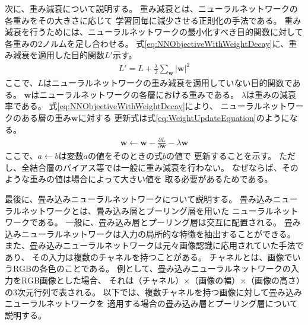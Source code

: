 次に、重み減衰について説明する。
重み減衰とは、ニューラルネットワークの各重みをその大きさに応じて
学習回毎に減少させる正則化の手法である。
重み減衰を行うためには、ニューラルネットワークの最小化すべき目的関数に対して
各重みの2ノルムを足し合わせる。
式\ref{eq:NNObjectiveWithWeightDecay}に、重み減衰を適用した目的関数$L'$示す。
\begin{gather} \label{eq:NNObjectiveWithWeightDecay}
  L' = L + \frac{\lambda}{2} \sum_{\mathbf{w}} {|\mathbf{w}|}^2
\end{gather}
ここで、$L$はニューラルネットワークの重み減衰を適用していない目的関数である。
$\mathbf{w}$はニューラルネットワークの各層における重みである。
$\lambda$は重みの減衰率である。
式\ref{eq:NNObjectiveWithWeightDecay}により、
ニューラルネットワークのある層の重み$\mathbf{w}$に対する
更新式は式\ref{eq:WeightUpdateEquation}のようになる。
\begin{gather} \label{eq:WeightUpdateEquation}
  \mathbf{w} \leftarrow \mathbf{w} - \frac{\partial L}{\partial \mathbf{w}}
                                   - \lambda \mathbf{w}
\end{gather}
ここで、$a \leftarrow b$は変数$a$の値をそのときの式$b$の値で
更新することを示す。
ただし、全結合層のバイアス等では一般に重み減衰を行わない。
なぜならば、そのような重みの値は場合によって大きい値を
取る必要があるためである。

最後に、畳み込みニューラルネットワークについて説明する。
畳み込みニューラルネットワークとは、畳み込み層とプーリング層を用いた
ニューラルネットワークである。
一般に、畳み込み層とプーリング層は交互に配置される。
畳み込みニューラルネットワークは入力の局所的な特徴を抽出することができる。
また、畳み込みニューラルネットワークは元々画像認識に応用されていた手法であり、
その入力は複数のチャネルを持つことがある。
チャネルとは、画像でいうRGBの各色のことである。
例として、畳み込みニューラルネットワークの入力をRGB画像とした場合、
それは（チャネル）×（画像の幅）×（画像の高さ）の3次元行列で表される。
以下では、複数チャネルを持つ画像に対して畳み込みニューラルネットワークを
適用する場合の畳み込み層とプーリング層について説明する。

